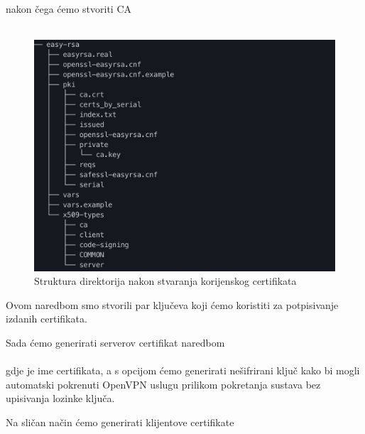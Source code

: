         \noindent
        nakon čega ćemo stvoriti CA  \\

        \noindent
         \\
        
        \begin{figure}[H]
            \centering
            \includegraphics[scale=0.5]{slike/afterBuildCa}
            \caption{Struktura direktorija nakon stvaranja korijenskog
            certifikata}
        \end{figure}

        \noindent
        Ovom naredbom smo stvorili par ključeva koji ćemo koristiti za
        potpisivanje izdanih certifikata. 

        \noindent
        Sada ćemo generirati serverov certifikat naredbom \\

        \noindent
         \\

        \noindent
        gdje je  ime certifikata, a s  opcijom ćemo
        generirati nešifrirani ključ kako bi mogli automatski pokrenuti OpenVPN
        uslugu prilikom pokretanja sustava bez upisivanja lozinke ključa.

        Na sličan način ćemo generirati klijentove certifikate \\

        \noindent
         \\
        
